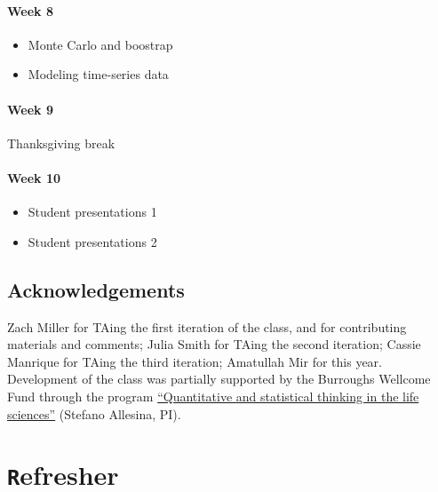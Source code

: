 \documentclass[
  letterpaper,
  DIV=11,
  numbers=noendperiod]{scrreprt}
\providecommand{\tightlist}{%
  \setlength{\itemsep}{0pt}\setlength{\parskip}{0pt}}\usepackage{longtable,booktabs,array}
\begin{document}
\subsubsection*{Week 8}\label{week-8}

\begin{itemize}
\tightlist
\item
  Monte Carlo and boostrap
\item
  Modeling time-series data
\end{itemize}

\subsubsection*{Week 9}\label{week-9}

Thanksgiving break

\subsubsection*{Week 10}\label{week-10}

\begin{itemize}
\tightlist
\item
  Student presentations 1
\item
  Student presentations 2
\end{itemize}

\section*{Acknowledgements}\label{acknowledgements}


Zach Miller for TAing the first iteration of the class, and for
contributing materials and comments; Julia Smith for TAing the second
iteration; Cassie Manrique for TAing the third iteration; Amatullah Mir
for this year. Development of the class was partially supported by the
Burroughs Wellcome Fund through the program
\href{https://www.bwfund.org/grant-programs/institutional-programs/quantitative-and-statistical-thinking-life-sciences/grant}{``Quantitative
and statistical thinking in the life sciences''} (Stefano Allesina, PI).


\chapter*{\texorpdfstring{\texttt{R}efresher}{Refresher}}\label{refresher}
\end{document}
